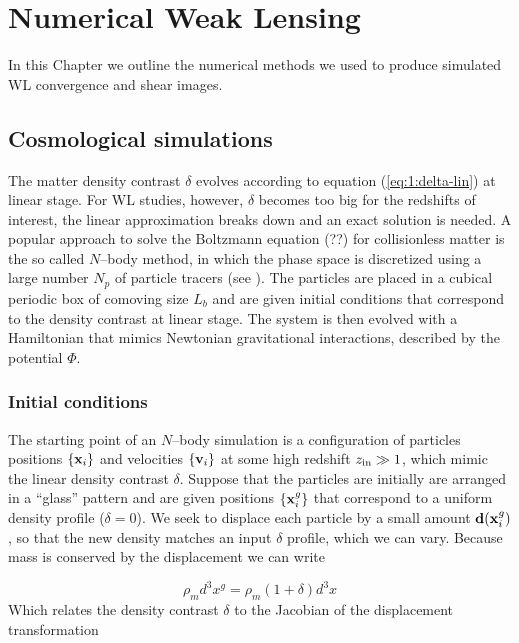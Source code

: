 
\chapter{Numerical Weak Lensing}
\lhead[\fancyplain{}{\thepage}]{\fancyplain{}{\rightmark}}
 \thispagestyle{plain}
\setlength{\parindent}{10mm}

In this Chapter we outline the numerical methods we used to produce simulated WL convergence and shear images. 


\section{Cosmological simulations}
The matter density contrast $\delta$ evolves according to equation (\ref{eq:1:delta-lin}) at linear stage. For WL studies, however, $\delta$ becomes too big for the redshifts of interest, the linear approximation breaks down and an exact solution is needed. A popular approach to solve the Boltzmann equation (??) for collisionless matter is the so called $N$--body method, in which the phase space is discretized using a large number $N_p$ of particle tracers (see \citep{gadget2}). The particles are placed in a cubical periodic box of comoving size $L_b$ and are given initial conditions that correspond to the density contrast at linear stage. The system is then evolved with a Hamiltonian that mimics Newtonian gravitational interactions, described by the potential $\Phi$.  

\subsection{Initial conditions}
The starting point of an $N$--body simulation is a configuration of particles positions $\{\mathbf{x}_i\}$ and velocities $\{\mathbf{v}_i\}$ at some high redshift $z_{\rm in}\gg 1$, which mimic the linear density contrast $\delta$. Suppose that the particles are initially are arranged in a ``glass'' pattern and are given positions $\{\mathbf{x}_i^g\}$ that correspond to a uniform density profile ($\delta=0$). We seek to displace each particle by a small amount $\mathbf{d}(\mathbf{x}_i^g)$, so that the new density matches an input $\delta$ profile, which we can vary. Because mass is conserved by the displacement we can write

\begin{equation}
\label{eq:3:masscons}
\rho_m d^3 x^g = \rho_m(1+\delta)d^3x
\end{equation} 
%
Which relates the density contrast $\delta$ to the Jacobian of the displacement transformation 

